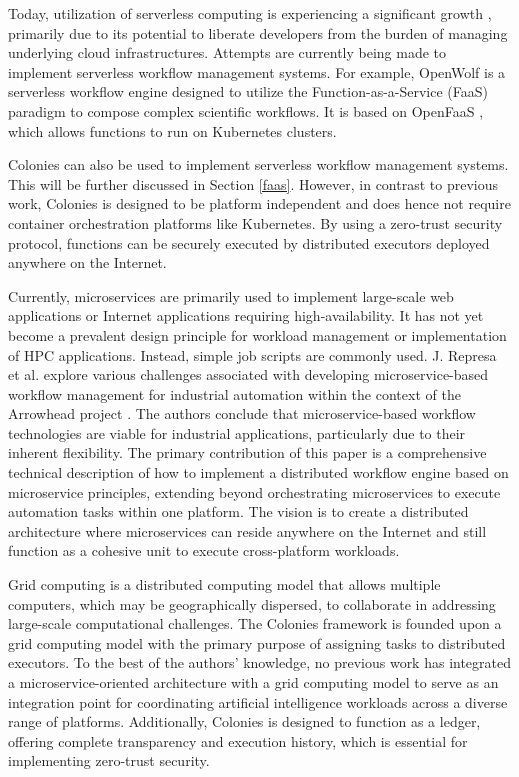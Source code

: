 \documentclass{article}
\begin{document}
Today, utilization of serverless computing is experiencing a significant growth \cite{cognit}, primarily due to its potential to liberate developers from the burden of managing underlying cloud infrastructures. Attempts are currently being made to implement serverless workflow management systems. For example, OpenWolf \cite{openwolf} is a serverless workflow engine designed to utilize the Function-as-a-Service (FaaS) paradigm to compose complex scientific workflows. It is based on OpenFaaS \cite{openfaas}, which allows functions to run on Kubernetes clusters. 

Colonies can also be used to implement serverless workflow management systems. This will be further discussed in Section \ref{faas}. However, in contrast to previous work, Colonies is designed to be platform independent and does hence not require container orchestration platforms like Kubernetes. By using a zero-trust security protocol, functions can be securely executed by distributed executors deployed anywhere on the Internet. 

Currently, microservices are primarily used to implement large-scale web applications or Internet applications requiring high-availability. It has not yet become a prevalent design principle for workload management or implementation of HPC applications. Instead, simple job scripts are commonly used. J. Represa et al. \cite{GarciaRepresa1740746, GarciaRepresa1640771} explore various challenges associated with developing microservice-based workflow management for industrial automation within the context of the Arrowhead project \cite{delsing2017iot}. The authors conclude that microservice-based workflow technologies are viable for industrial applications, particularly due to their inherent flexibility. The primary contribution of this paper is a comprehensive technical description of how to implement a distributed workflow engine based on microservice principles, extending beyond orchestrating microservices to execute automation tasks within one platform. The vision is to create a distributed architecture where microservices can reside anywhere on the Internet and still function as a cohesive unit to execute cross-platform workloads.  

Grid computing \cite{grid_computing} is a distributed computing model that allows multiple computers, which may be geographically dispersed, to collaborate in addressing large-scale computational challenges. The Colonies framework is founded upon a grid computing model with the primary purpose of assigning tasks to distributed executors. To the best of the authors' knowledge, no previous work has integrated a microservice-oriented architecture with a grid computing model to serve as an integration point for coordinating artificial intelligence workloads across a diverse range of platforms. Additionally, Colonies is designed to function as a ledger, offering complete transparency and execution history, which is essential for implementing zero-trust security.
\end{document}
